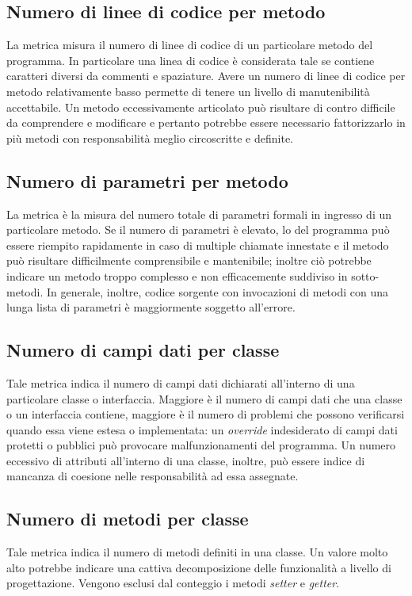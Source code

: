 \subsection{Numero di linee di codice per metodo}
La metrica misura il numero di linee di codice di un particolare metodo del programma. In particolare una linea di codice è considerata tale se contiene caratteri diversi da commenti e spaziature. Avere un numero di linee di codice per metodo relativamente basso permette di tenere un livello di manutenibilità accettabile. Un metodo eccessivamente articolato può risultare di contro difficile da comprendere e modificare e pertanto potrebbe essere necessario fattorizzarlo in più metodi con responsabilità meglio circoscritte e definite.



\subsection{Numero di parametri per metodo}
La metrica è la misura del numero totale di parametri formali in ingresso di un particolare metodo. Se il numero di parametri è elevato, lo  del programma può essere riempito rapidamente in caso di multiple chiamate innestate e il metodo può risultare difficilmente comprensibile e mantenibile; inoltre ciò potrebbe indicare un metodo troppo complesso e non efficacemente suddiviso in sotto-metodi. In generale, inoltre, codice sorgente con invocazioni di metodi con una lunga lista di parametri è maggiormente soggetto all'errore.



\subsection{Numero di campi dati per classe}
Tale metrica indica il numero di campi dati dichiarati all'interno di una particolare classe o interfaccia. Maggiore è il numero di campi dati che una classe o un interfaccia contiene, maggiore è il numero di problemi che possono verificarsi quando essa viene estesa o implementata: un \emph{override} indesiderato di campi dati protetti o pubblici può provocare malfunzionamenti del programma. Un numero eccessivo di attributi all'interno di una classe, inoltre, può essere indice di mancanza di coesione nelle responsabilità ad essa assegnate.



\subsection{Numero di metodi per classe}
Tale metrica indica il numero di metodi definiti in una classe. Un valore molto alto potrebbe indicare una cattiva decomposizione delle funzionalità a livello di progettazione. Vengono esclusi dal conteggio i metodi \emph{setter} e \emph{getter}.



